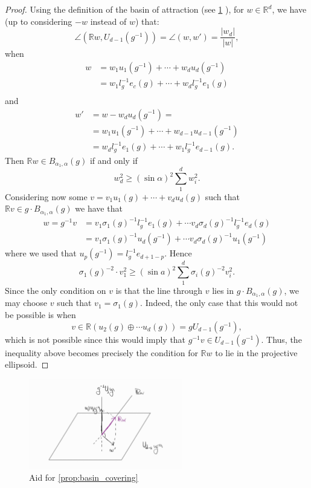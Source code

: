 \documentclass{report}
\begin{document}
\begin{proof}
Using the definition of the basin of attraction (see \cref{fig:projection} ), for $w \in \mathbb R^d$, we have (up to considering $-w$ instead of $w$) that: 
\[
\angle(\mathbb R w, U_{d-1}(g^{-1})) = \angle(w, w') = \frac{|w_d|}{|w|},
\]
when
\begin{align*}
    w &= w_1 u_1(g^{-1}) + \cdots + w_d u_d(g^{-1})\\
    &= w_1 l_g^{-1} e_c(g) + \cdots + w_d l_g^{-1} e_1(g)\\
\end{align*}
and
\begin{align*}
    w' &= w - w_d u_d(g^{-1}) =\\
    &= w_1 u_1(g^{-1}) + \cdots + w_{d-1} u_{d-1}(g^{-1})\\
    &= w_d l_g^{-1} e_1(g) + \cdots + w_1 l_g^{-1} e_{d-1}(g).
\end{align*}
Then $\mathbb R w \in B_{\alpha_1, \alpha}(g)$ if and only if
\[
    w_d^2 \geq (\sin \alpha)^2 \sum_1^d w_i^2.
\]
Considering now some $v = v_1 u_1(g) + \cdots + v_d u_d(g)$ such that 
$\mathbb R v \in g \cdot B_{\alpha_1, \alpha}(g)$
we have that
\begin{align*}
    w = g^{-1} v &= v_1 \sigma_1(g)^{-1} l_g^{-1} e_1(g) + \cdots v_d \sigma_d(g)^{-1} l_g^{-1} e_d(g)\\
    &= v_1 \sigma_1(g)^{-1} u_{d}(g^{-1}) + \cdots v_d \sigma_d(g)^{-1} u_1(g^{-1})
\end{align*}
where we used that $u_p(g^{-1}) = l_g^{-1} e_{d+1-p}$.
Hence
\[
    \sigma_1(g)^{-2} \cdot v_1^2 \geq (\sin a)^2 \sum_1^d \sigma_i(g)^{-2} v_i^2.
\]
Since the only condition on $v$ is that the line through $v$ lies in $g \cdot B_{\alpha_1, \alpha}(g)$, we may choose $v$ such that $v_1 = \sigma_1(g)$.
Indeed, the only case that this would not be possible is when 
$$v \in \mathbb R(u_2(g) \oplus \cdots u_d(g)) = g U_{d-1}(g^{-1}), $$
which is not possible since this would imply that $g^{-1} v \in U_{d-1}(g^{-1})$.
Thus, the inequality above becomes precisely the condition for $\mathbb R w$ to lie in the projective ellipsoid.
\end{proof}
\begin{figure}[h]
    \centering
    \includegraphics[width=0.6\textwidth]{projection.jpg}
    \caption{Aid for \cref{prop:basin_covering}}
    \label{fig:projection}
\end{figure}
\end{document}
